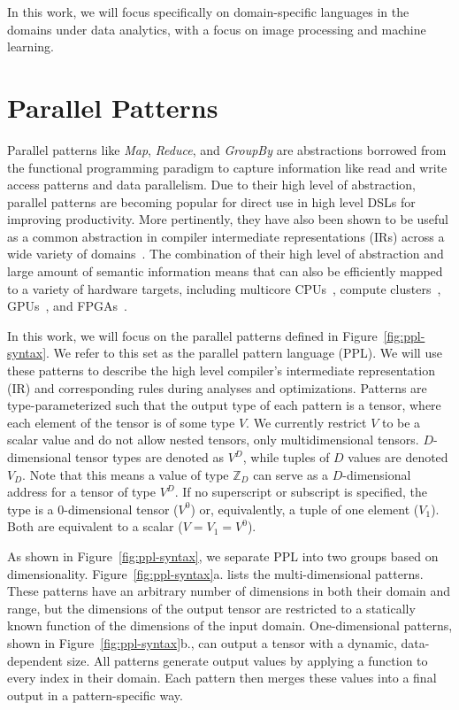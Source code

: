 In this work, we will focus specifically on domain-specific languages in the domains under
data analytics, with a focus on image processing and machine learning.


\section{Parallel Patterns}

Parallel patterns like \emph{Map}, \emph{Reduce}, and \emph{GroupBy} are abstractions
borrowed from the functional programming paradigm
to capture information like read and write access patterns and data parallelism.
Due to their high level of abstraction, parallel patterns are becoming
popular for direct use in high level DSLs for improving productivity.
More pertinently, they have also been shown to be useful as a common abstraction in compiler
intermediate representations (IRs) across a wide variety of domains~\cite{ecoop13sujeeth,pldi13halide}.
The combination of their high level of abstraction and large amount of semantic information
means that can also be efficiently mapped to a variety of hardware
targets, including multicore CPUs~\cite{scala,haskell,delite-tecs14},
compute clusters~\cite{mapreduce,zaharia10spark,spartan},
GPUs~\cite{catanzaro11copperhead,micro14lee},
and FPGAs~\cite{auerbach10lime,george14fpl}.



In this work, we will focus on the parallel patterns defined in Figure~\ref{fig:ppl-syntax}.
We refer to this set as the parallel pattern language (PPL).
We will use these patterns to describe the high level
compiler's intermediate representation (IR) and corresponding rules during analyses and optimizations.
Patterns are type-parameterized such that the output type of each pattern is a tensor, where each
element of the tensor is of some type $V$. We currently restrict $V$ to be a scalar value and
do not allow nested tensors, only multidimensional tensors.
$D$-dimensional tensor types are denoted as $V^D$, while tuples of $D$ values are
denoted $V_D$. Note that this means a value of type $\mathbb{Z}_D$ can serve as a $D$-dimensional address
for a tensor of type $V^D$.
If no superscript or subscript is specified, the type is a 0-dimensional tensor ($V^0$) or, equivalently, a tuple of one element ($V_1$).
Both are equivalent to a scalar ($V = V_1 = V^0$).

As shown in Figure~\ref{fig:ppl-syntax}, we separate PPL into two groups based on dimensionality.
Figure~\ref{fig:ppl-syntax}a. lists the multi-dimensional patterns.
These patterns have an arbitrary number of dimensions in both their domain and range,
but the dimensions of the output tensor
are restricted to a statically known function of the dimensions of the input domain.
One-dimensional patterns, shown in Figure~\ref{fig:ppl-syntax}b., can output a tensor with a dynamic, data-dependent size.
All patterns generate output values by applying a function to
every index in their domain. Each pattern then merges these values into a final
output in a pattern-specific way.

